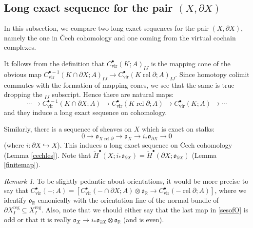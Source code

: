 \documentclass[12pt]{article}
\theoremstyle{definition}
\theoremstyle{remark}
\newtheorem{remark}[theorem]{Remark}
\numberwithin{equation}{subsection}
\newcommand{\oo}{\mathfrak o}
\newcommand{\RR}{\mathbb R}
\newcommand{\cH}{\check H}
\newcommand{\vir}{\mathrm{vir}}
\newcommand{\reg}{\mathrm{reg}}
\newcommand{\rel}{\operatorname{rel}}
\begin{document}
\subsection{Long exact sequence for the pair \texorpdfstring{$(X,\partial X)$}{(X,dX)}}\label{Fsheafproperties}

In this subsection, we compare two long exact sequences for the pair $(X,\partial X)$, namely the one in \v Cech cohomology and one coming from the virtual cochain complexes.

It follows from the definition that $C^\bullet_\vir(K;A)_{IJ}$ is the mapping cone of the obvious map $C^{\bullet-1}_\vir(K\cap\partial X;A)_{IJ}\to C^\bullet_\vir(K\rel\partial;A)_{IJ}$.  Since homotopy colimit commutes with the formation of mapping cones, we see that the same is true dropping the $_{IJ}$ subscript.  Hence there are natural maps:
\begin{equation}\label{sesofF}
\cdots\to C^{\bullet-1}_\vir(K\cap\partial X;A)\to C^\bullet_\vir(K\rel\partial;A)\to C^\bullet_\vir(K;A)\to\cdots
\end{equation}
and they induce a long exact sequence on cohomology.

Similarly, there is a sequence of sheaves on $X$ which is exact on stalks:
\begin{equation}\label{sesofO}
0\to\oo_{X\rel\partial}\to\oo_X\to i_\ast\oo_{\partial X}\to 0
\end{equation}
(where $i:\partial X\hookrightarrow X$).  This induces a long exact sequence on \v Cech cohomology (Lemma \ref{cechles}).  Note that $\cH^\bullet(X;i_\ast\oo_{\partial X})=\cH^\bullet(\partial X;\oo_{\partial X})$ (Lemma \ref{finitemap}).

\begin{remark}\label{bdryorrmk}
To be slightly pedantic about orientations, it would be more precise to say that $C^\bullet_\vir(-;A)=[C^\bullet_\vir(-\cap\partial X;A)\otimes\oo_\RR\to C^\bullet_\vir(-\rel\partial;A)]$, where we identify $\oo_\RR$ canonically with the orientation line of the normal bundle of $\partial X_I^\reg\subseteq X_I^\reg$.  Also, note that we should either say that the last map in \eqref{sesofO} is odd or that it is really $\oo_X\to i_\ast\oo_{\partial X}\otimes\oo_\RR$ (and is even).
\end{remark}
\end{document}
